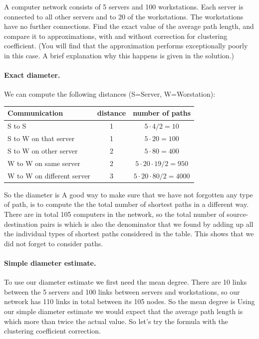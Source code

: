 
A computer network consists of 5 servers and 100 workstations. Each server is connected to all other servers and to 20 of the workstations. The workstations have no further connections. Find the exact value of the average path length, and compare it to approximations, with and without correction for clustering coefficient. (You will find that the approximation performs exceptionally poorly in this case. A brief explanation why this happens is given in the solution.)  

\solution
\paragraph{Exact diameter.}We can compute the following distances (S=Server, W=Worstation):
\begin{center}
\begin{tabular}{l c c}
Communication & distance & number of paths \\\hline
S to S & 1 & $5\cdot 4/2 = 10$ \\
S to W on that server & 1 & $5\cdot 20 = 100$ \\
S to W on other server & 2 & $ 5 \cdot 80 = 400$ \\
W to W on same server & 2 & $5 \cdot 20 \cdot 19 /2 = 950$ \\
W to W on different server & 3 & $5\cdot 20 \cdot 80/2=4000$
\end{tabular}    
\end{center}
So the diameter is 
A good way to make sure that we have not forgotten any type of path, is to compute the the total number of shortest paths in a different way. There are in total 105 computers in the network, so the total number of source-destination pairs is 
which is also the denominator that we found by adding up all the individual types of shortest paths considered in the table. This shows that we did not forget to consider paths. 

\paragraph{Simple diameter estimate.}To use our diameter estimate we first need the mean degree. There are 10 links between the 5 servers and 100 links between servers and workstations, so our network has 110 links in total between its 105 nodes. So the mean degree is 
Using our simple diameter estimate we would expect that the average path length is 
which more than twice the actual value. So let's try the formula with the clustering coefficient correction.
